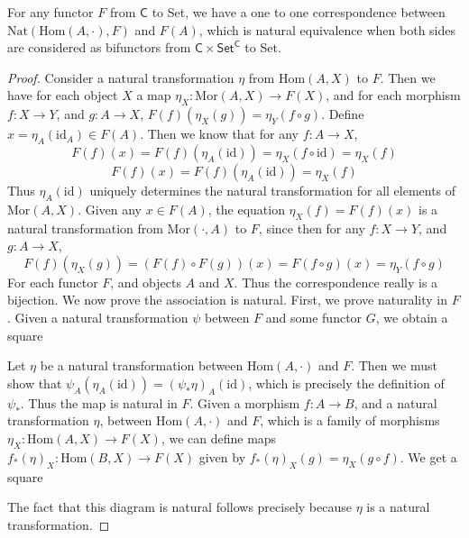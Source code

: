 \begin{theorem}[Yoneda]
    For any functor $F$ from $\mathsf{C}$ to {\sf Set}, we have a one to one correspondence between $\text{Nat}(\text{Hom}(A,\cdot),F)$ and $F(A)$, which is natural equivalence when both sides are considered as bifunctors from $\mathsf{C} \times \mathsf{Set}^{\mathsf{C}}$ to {\sf Set}.
\end{theorem}
\begin{proof}
    Consider a natural transformation $\eta$ from $\text{Hom}(A,X)$ to $F$. Then we have for each object $X$ a map $\eta_X: \text{Mor}(A,X) \to F(X)$, and for each morphism $f: X \to Y$, and $g: A \to X$, $F(f)(\eta_X(g)) = \eta_Y(f \circ g)$. Define $x = \eta_A(\text{id}_A) \in F(A)$. Then we know that for any $f: A \to X$,
    \[ F(f)(x) = F(f)(\eta_A(\text{id})) = \eta_X(f \circ \text{id}) = \eta_X(f) \]
    \[ F(f)(x) = F(f)(\eta_A(\text{id})) = \eta_X(f) \]
    Thus $\eta_A(\text{id})$ uniquely determines the natural transformation for all elements of $\text{Mor}(A,X)$. Given any $x \in F(A)$, the equation $\eta_X(f) = F(f)(x)$ is a natural transformation from $\text{Mor}(\cdot,A)$ to $F$, since then for any $f: X \to Y$, and $g: A \to X$,
    \[ F(f)(\eta_X(g)) = (F(f) \circ F(g))(x) = F(f \circ g)(x) = \eta_Y(f \circ g) \]
    For each functor $F$, and objects $A$ and $X$. Thus the correspondence really is a bijection. We now prove the association is natural. First, we prove naturality in $F$. Given a natural transformation $\psi$ between $F$ and some functor $G$, we obtain a square
    \begin{center}
    \end{center}
    Let $\eta$ be a natural transformation between $\text{Hom}(A,\cdot)$ and $F$. Then we must show that $\psi_A(\eta_A(\text{id})) = (\psi_* \eta)_A(\text{id})$, which is precisely the definition of $\psi_*$. Thus the map is natural in $F$. Given a morphism $f: A \to B$, and a natural transformation $\eta$, between $\text{Hom}(A,\cdot)$ and $F$, which is a family of morphisms $\eta_X: \text{Hom}(A,X) \to F(X)$, we can define maps $f_*(\eta)_X: \text{Hom}(B,X) \to F(X)$ given by $f_*(\eta)_X(g) = \eta_X(g \circ f)$. We get a square
    \begin{center}
    \end{center}
    The fact that this diagram is natural follows precisely because $\eta$ is a natural transformation.
\end{proof}

